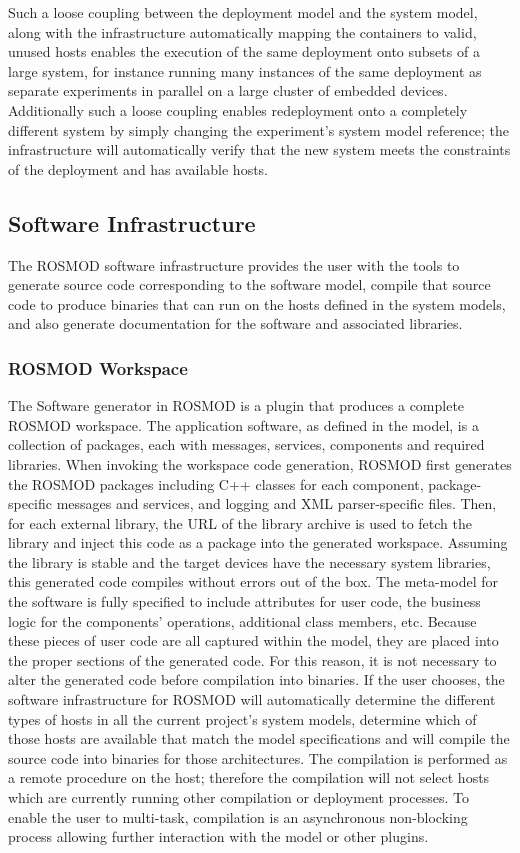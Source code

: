 Such a loose coupling between the deployment model and the system
model, along with the infrastructure automatically mapping the
containers to valid, unused hosts enables the execution of the same
deployment onto subsets of a large system, for instance running many
instances of the same deployment as separate experiments in parallel
on a large cluster of embedded devices.  Additionally such a loose
coupling enables redeployment onto a completely different system by
simply changing the experiment's system model reference; the
infrastructure will automatically verify that the new system meets the
constraints of the deployment and has available hosts.

\subsection{Software Infrastructure} 

The ROSMOD software infrastructure provides the user with the tools to
generate source code corresponding to the software model, compile that
source code to produce binaries that can run on the hosts defined in
the system models, and also generate documentation for the software
and associated libraries.

\subsubsection{ROSMOD Workspace}
\label{sec:code_generation}

The Software generator in ROSMOD is a plugin that produces a complete
ROSMOD workspace. The application software, as defined in the model,
is a collection of packages, each with messages, services, components
and required libraries. When invoking the workspace code generation,
ROSMOD first generates the ROSMOD packages including C++ classes for
each component, package-specific messages and services, and logging
and XML parser-specific files. Then, for each external library, the
URL of the library archive is used to fetch the library and inject
this code as a package into the generated workspace. Assuming the
library is stable and the target devices have the necessary system
libraries, this generated code compiles without errors out of the
box. The meta-model for the software is fully specified to include
attributes for user code, the business logic for the components'
operations, additional class members, etc. Because these pieces of
user code are all captured within the model, they are placed into the
proper sections of the generated code.  For this reason, it is not
necessary to alter the generated code before compilation into
binaries.  If the user chooses, the software infrastructure for ROSMOD
will automatically determine the different types of hosts in all the
current project's system models, determine which of those hosts are
available that match the model specifications and will compile the
source code into binaries for those architectures.  The compilation is
performed as a remote procedure on the host; therefore the compilation
will not select hosts which are currently running other compilation or
deployment processes.  To enable the user to multi-task, compilation
is an asynchronous non-blocking process allowing further interaction
with the model or other plugins.

